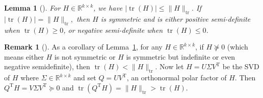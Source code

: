 \documentclass[11pt]{article}
\def\bbR{\mathbb{R}}
\DeclareMathOperator{\tr}{tr}
\DeclareMathOperator{\F}{F}
\DeclareMathOperator{\T}{T}
\newtheorem{lemma}{Lemma}[section]
\theoremstyle{definition}
\newtheorem{remark}{Remark}[section]
\numberwithin{equation}{section}
\begin{document}

\begin{lemma}[{\cite[Lemma 3]{zhwb:2022}}]\label{lm:maxtrace}
For $H\in\bbR^{k\times k}$, we have
	$
	|\tr(H)|\le\|H\|_{\tr}. %
	$
If
	$
	|\tr(H)|=\|H\|_{\tr}, %
	$
then
$H$ is symmetric and is either positive semi-definite when $\tr(H)\ge 0$, or negative semi-definite when $\tr(H)\le 0$.
\end{lemma}

\begin{remark}[\cite{wazl:2022a}]\label{rk:tr-max}
As a corollary of Lemma~\ref{lm:maxtrace}, for any $H\in\bbR^{k\times k}$, if $H\not\succeq 0$
(which means either $H$ is not symmetric or $H$ is symmetric but indefinite or even negative semidefinite),
then $\tr(H)<\|H\|_{\tr}$.
Now let $H=U\Sigma V^{\T}$ be the SVD of $H$ \cite{govl:2013} where $\Sigma\in\bbR^{k\times k}$
and set $Q=UV^{\T}$, an orthonormal polar factor of $H$. Then
$Q^{\T}H=V\Sigma V^{\T}\succeq 0$ and $\tr(Q^{\T}H)=\|H\|_{\tr}>\tr(H)$.
\end{remark}
\end{document}
